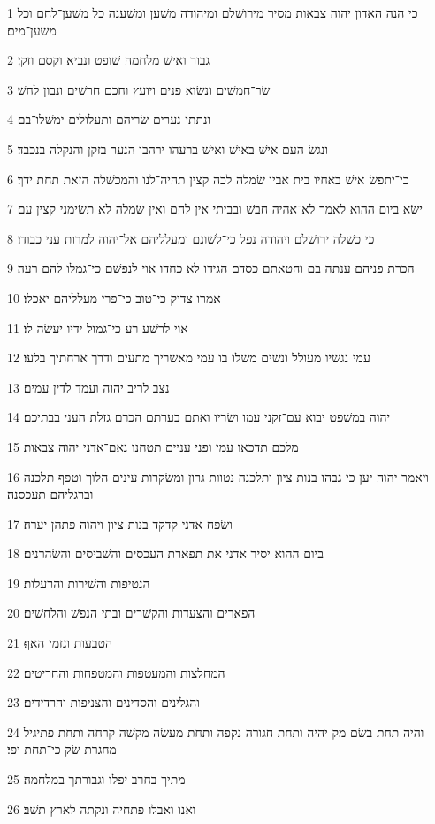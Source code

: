 \par 1 כי הנה האדון יהוה צבאות מסיר מירושׁלם ומיהודה משׁען ומשׁענה כל משׁען־לחם וכל משׁען־מים׃
\par 2 גבור ואישׁ מלחמה שׁופט ונביא וקסם וזקן׃
\par 3 שׂר־חמשׁים ונשׂוא פנים ויועץ וחכם חרשׁים ונבון לחשׁ׃
\par 4 ונתתי נערים שׂריהם ותעלולים ימשׁלו־בם׃
\par 5 ונגשׂ העם אישׁ באישׁ ואישׁ ברעהו ירהבו הנער בזקן והנקלה בנכבד׃
\par 6 כי־יתפשׂ אישׁ באחיו בית אביו שׂמלה לכה קצין תהיה־לנו והמכשׁלה הזאת תחת ידך׃
\par 7 ישׂא ביום ההוא לאמר לא־אהיה חבשׁ ובביתי אין לחם ואין שׂמלה לא תשׂימני קצין עם׃
\par 8 כי כשׁלה ירושׁלם ויהודה נפל כי־לשׁונם ומעלליהם אל־יהוה למרות עני כבודו׃
\par 9 הכרת פניהם ענתה בם וחטאתם כסדם הגידו לא כחדו אוי לנפשׁם כי־גמלו להם רעה׃
\par 10 אמרו צדיק כי־טוב כי־פרי מעלליהם יאכלו׃
\par 11 אוי לרשׁע רע כי־גמול ידיו יעשׂה לו׃
\par 12 עמי נגשׂיו מעולל ונשׁים משׁלו בו עמי מאשׁריך מתעים ודרך ארחתיך בלעו׃
\par 13 נצב לריב יהוה ועמד לדין עמים׃
\par 14 יהוה במשׁפט יבוא עם־זקני עמו ושׂריו ואתם בערתם הכרם גזלת העני בבתיכם׃
\par 15 מלכם תדכאו עמי ופני עניים תטחנו נאם־אדני יהוה צבאות׃
\par 16 ויאמר יהוה יען כי גבהו בנות ציון ותלכנה נטוות גרון ומשׂקרות עינים הלוך וטפף תלכנה וברגליהם תעכסנה׃
\par 17 ושׂפח אדני קדקד בנות ציון ויהוה פתהן יערה׃
\par 18 ביום ההוא יסיר אדני את תפארת העכסים והשׁביסים והשׂהרנים׃
\par 19 הנטיפות והשׁירות והרעלות׃
\par 20 הפארים והצעדות והקשׁרים ובתי הנפשׁ והלחשׁים׃
\par 21 הטבעות ונזמי האף׃
\par 22 המחלצות והמעטפות והמטפחות והחריטים׃
\par 23 והגלינים והסדינים והצניפות והרדידים׃
\par 24 והיה תחת בשׂם מק יהיה ותחת חגורה נקפה ותחת מעשׂה מקשׁה קרחה ותחת פתיגיל מחגרת שׂק כי־תחת יפי׃
\par 25 מתיך בחרב יפלו וגבורתך במלחמה׃
\par 26 ואנו ואבלו פתחיה ונקתה לארץ תשׁב׃

